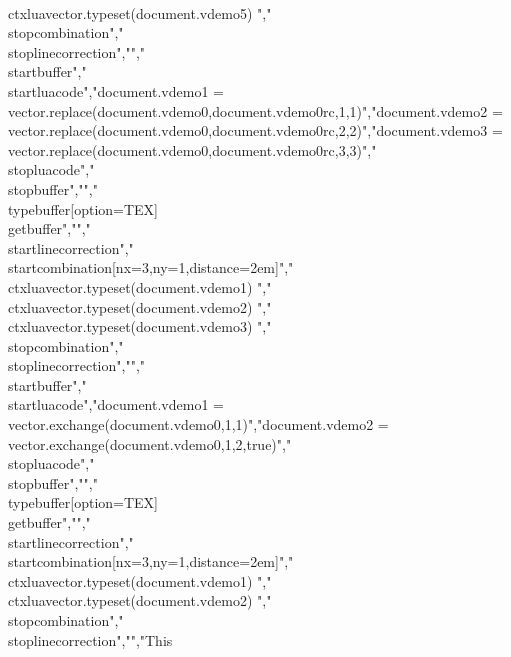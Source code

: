 {\\ctxlua{vector.typeset(document.vdemo5)}} {}","\\stopcombination","\\stoplinecorrection","","\\startbuffer","\\startluacode","document.vdemo1 = vector.replace(document.vdemo0,document.vdemo0rc,1,1)","document.vdemo2 = vector.replace(document.vdemo0,document.vdemo0rc,2,2)","document.vdemo3 = vector.replace(document.vdemo0,document.vdemo0rc,3,3)","\\stopluacode","\\stopbuffer","","\\typebuffer[option=TEX] \\getbuffer","","\\startlinecorrection","\\startcombination[nx=3,ny=1,distance=2em]","    {\\ctxlua{vector.typeset(document.vdemo1)}} {}","    {\\ctxlua{vector.typeset(document.vdemo2)}} {}","    {\\ctxlua{vector.typeset(document.vdemo3)}} {}","\\stopcombination","\\stoplinecorrection","","\\startbuffer","\\startluacode","document.vdemo1 = vector.exchange(document.vdemo0,1,1)","document.vdemo2 = vector.exchange(document.vdemo0,1,2,true)","\\stopluacode","\\stopbuffer","","\\typebuffer[option=TEX] \\getbuffer","","\\startlinecorrection","\\startcombination[nx=3,ny=1,distance=2em]","    {\\ctxlua{vector.typeset(document.vdemo1)}} {}","    {\\ctxlua{vector.typeset(document.vdemo2)}} {}","\\stopcombination","\\stoplinecorrection","","This 